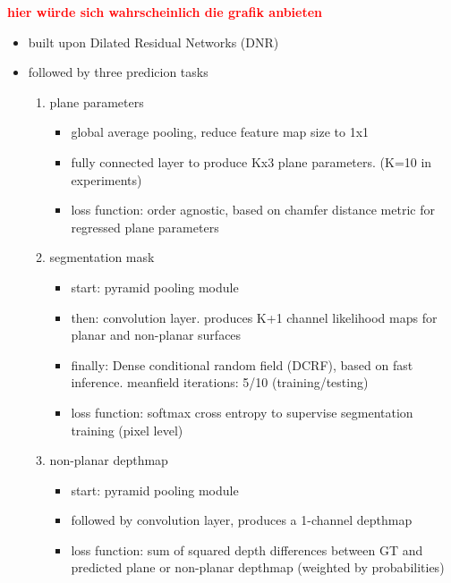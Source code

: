 \documentclass[main.tex]{subfiles}
\begin{document}
\textbf{\textcolor{red}{hier würde sich wahrscheinlich die grafik anbieten}}
\begin{itemize}
    \item built upon Dilated Residual Networks (DNR) 
    \item followed by three predicion tasks
    \begin{enumerate}
        \item plane parameters
        \begin{itemize}
            \item global average pooling, reduce feature map size to 1x1
            \item fully connected layer to produce Kx3 plane parameters. (K=10 in experiments)
            \item loss function: order agnostic, based on chamfer distance metric for regressed plane parameters
        \end{itemize}
        \item segmentation mask
        \begin{itemize}
            \item start: pyramid pooling module
            \item then: convolution layer. produces K+1 channel likelihood maps for planar and non-planar surfaces
            \item finally: Dense conditional random field (DCRF), based on fast inference. meanfield iterations: 5/10 (training/testing)
            \item loss function: softmax cross entropy to supervise segmentation training (pixel level)
        \end{itemize}
        \item non-planar depthmap
        \begin{itemize}
            \item start: pyramid pooling module
            \item followed by convolution layer, produces a 1-channel depthmap
            \item loss function: sum of squared depth differences between GT and predicted plane or non-planar 
            depthmap (weighted by probabilities) 
        \end{itemize}
    \end{enumerate} 
\end{itemize}
\end{document}
